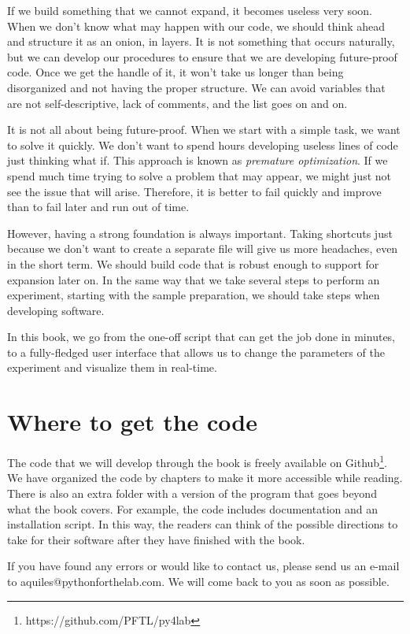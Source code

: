 If we build something that we cannot expand, it becomes useless very soon. When we don't know what may happen with our code, we should think ahead and structure it as an onion, in layers. It is not something that occurs naturally, but we can develop our procedures to ensure that we are developing future-proof code. Once we get the handle of it, it won't take us longer than being disorganized and not having the proper structure. We can avoid variables that are not self-descriptive, lack of comments, and the list goes on and on.

It is not all about being future-proof. When we start with a simple task, we want to solve it quickly. We don't want to spend hours developing useless lines of code just thinking what if. This approach is known as \textit{premature optimization}. If we spend much time trying to solve a problem that may appear, we might just not see the issue that will arise. Therefore, it is better to fail quickly and improve than to fail later and run out of time. 

However, having a strong foundation is always important. Taking shortcuts just because we don't want to create a separate file will give us more headaches, even in the short term. We should build code that is robust enough to support for expansion later on. In the same way that we take several steps to perform an experiment, starting with the sample preparation, we should take steps when developing software.

In this book, we go from the one-off script that can get the job done in minutes, to a fully-fledged user interface that allows us to change the parameters of the experiment and visualize them in real-time.

\section{Where to get the code}\label{sec:where-to-get-the-code}
The code that we will develop through the book is freely available on Github\footnote{https://github.com/PFTL/py4lab}. We have organized the code by chapters to make it more accessible while reading. There is also an extra folder with a version of the program that goes beyond what the book covers. For example, the code includes documentation and an installation script. In this way, the readers can think of the possible directions to take for their software after they have finished with the book.

\sloppy If you have found any errors or would like to contact us, please send us an e-mail to {aquiles@pythonforthelab.com}. We will come back to you as soon as possible.

